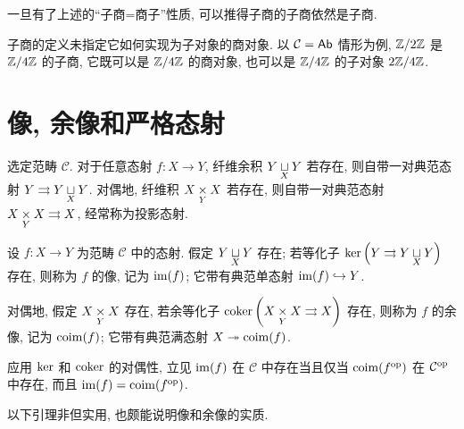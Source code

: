 一旦有了上述的``子商=商子''性质, 可以推得子商的子商依然是子商.

子商的定义未指定它如何实现为子对象的商对象. 以 $\mathcal{C} = \mathsf{Ab}$ 情形为例, $\mathbb{Z}/2\mathbb{Z}$ 是 $\mathbb{Z}/4\mathbb{Z}$ 的子商, 它既可以是 $\mathbb{Z}/4\mathbb{Z}$ 的商对象, 也可以是 $\mathbb{Z}/4\mathbb{Z}$ 的子对象 $2\mathbb{Z}/4\mathbb{Z}$.

\section{像, 余像和严格态射}\label{sec:images}
选定范畴 $\mathcal{C}$. 对于任意态射 $f: X \to Y$, 纤维余积 $Y \underset{X}{\sqcup} Y$ 若存在, 则自带一对典范态射 $Y \rightrightarrows Y \underset{X}{\sqcup} Y$. 对偶地, 纤维积 $X \underset{Y}{\times} X$ 若存在, 则自带一对典范态射 $X \underset{Y}{\times} X \rightrightarrows X$, 经常称为投影态射.

\begin{definition}[像和余像]\label{def:Im-Coim}
	 
	 
	设 $f: X \to Y$ 为范畴 $\mathcal{C}$ 中的态射. 假定 $Y \underset{X}{\sqcup} Y$ 存在; 若等化子 $\operatorname{ker}\left( Y \rightrightarrows Y \underset{X}{\sqcup} Y\right)$ 存在, 则称为 $f$ 的像, 记为 $\operatorname{im}(f)$; 它带有典范单态射 $\operatorname{im}(f) \hookrightarrow Y$.
	
	对偶地, 假定 $X \underset{Y}{\times} X$ 存在, 若余等化子 $\operatorname{coker}\left( X \underset{Y}{\times} X \rightrightarrows X \right)$ 存在, 则称为 $f$ 的余像, 记为 $\operatorname{coim}(f)$; 它带有典范满态射 $X \twoheadrightarrow\operatorname{coim}(f)$.
\end{definition}

\begin{remark}\label{rem:im-coim-duality}
	应用 $\operatorname{ker}$ 和 $\operatorname{coker}$ 的对偶性, 立见 $\operatorname{im}(f)$ 在 $\mathcal{C}$ 中存在当且仅当 $\operatorname{coim}(f^{\operatorname{op}})$ 在 $\mathcal{C}^{\operatorname{op}}$ 中存在, 而且 $\operatorname{im}(f) = \operatorname{coim}(f^{\operatorname{op}})$.
\end{remark}

以下引理非但实用, 也颇能说明像和余像的实质.

